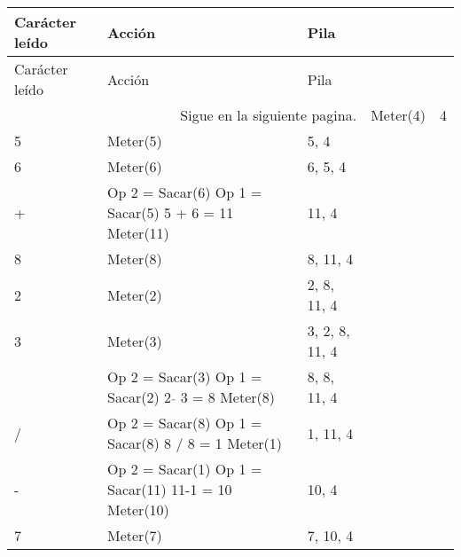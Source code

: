 \documentclass[12pt ]{article}
\begin{document}
 \begin{longtable}[h]{p{4cm} p{4cm} p{4cm}}
 	
 	\hline
 	
 	\rowcolor{LightBlue2} Carácter leído &Acción& Pila  \\
 	\hline\hline
 	\endfirsthead
 	
 	\hline
 	\rowcolor{LightBlue2} Carácter leído &Acción& Pila \\
 	\hline\hline
 	\endhead
 	
 	\multicolumn{3}{r}{Sigue en la siguiente pagina.}
 	\endfoot
 	
 	\endlastfoot
 	
 	
 	4 & Meter(4) & 4 \\ 
 	\rowcolor{gray!20}5 &Meter(5)&5, 4 \\
 	
 	
 	6 & Meter(6) & 6, 5, 4 \\ 
 	\rowcolor{gray!20}  + &Op 2 = Sacar(6)\hspace{1 cm} Op 1 = Sacar(5) \hspace{1 cm} 5 + 6 = 11 \hspace{2 cm} Meter(11) &11, 4 \\
 	
 	
 	8 & Meter(8) & 8, 11, 4 \\ 
 	\rowcolor{gray!20}2 &Meter(2)&2, 8, 11, 4 \\
 	
 	3 & Meter(3) & 3, 2, 8, 11, 4 \\ 
 	\rowcolor{gray!20}  $\hat{{}}$ &Op 2 = Sacar(3)\hspace{2 cm} Op 1 = Sacar(2) \hspace{3 cm} 2 $\hat{{}}$ 3 = 8 \hspace{2 cm} Meter(8) &8,  8, 11, 4\\
 	
 	  / &Op 2 = Sacar(8)\hspace{2 cm} Op 1 = Sacar(8) \hspace{3 cm} 8 / 8 = 1 \hspace{2 cm} Meter(1) &1, 11, 4\\
 	  
 	  
 	  \rowcolor{gray!20}  - &Op 2 = Sacar(1)\hspace{2 cm} Op 1 = Sacar(11) \hspace{3 cm}  11-1 = 10 \hspace{2 cm} Meter(10) & 10, 4\\
 	
 	
 	7 & Meter(7) & 7, 10, 4 \\ 
 	

\end{longtable}
\end{document}
